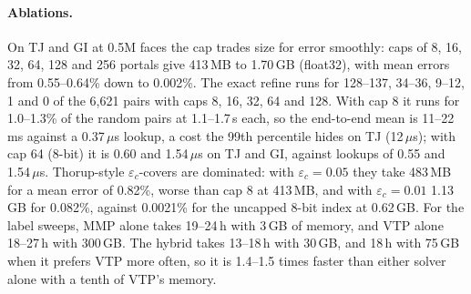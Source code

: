 \documentclass[sigconf,nonacm,screen]{acmart}
\newcommand{\eps}{\varepsilon}
\begin{document}
\paragraph{Ablations.}
On TJ and GI at 0.5M faces the cap trades size for error smoothly: caps of 8, 16, 32, 64, 128 and 256 portals give
413\,MB to 1.70\,GB (float32), with mean errors from 0.55--0.64\% down to 0.002\%. The exact refine runs for
128--137, 34--36, 9--12, 1 and 0 of the 6,621 pairs with caps 8, 16, 32, 64 and 128. With cap 8 it runs for
1.0--1.3\% of the random pairs at 1.1--1.7\,s each, so the end-to-end mean is 11--22\,ms against a 0.37\,$\mu$s
lookup, a cost the 99th percentile hides on TJ (12\,$\mu$s); with cap 64 (8-bit) it is 0.60 and 1.54\,$\mu$s on
TJ and GI, against lookups of 0.55 and 1.54\,$\mu$s. Thorup-style $\eps_c$-covers are dominated:
with $\eps_c=0.05$ they take 483\,MB for a mean error of 0.82\%, worse than cap 8 at 413\,MB, and with
$\eps_c=0.01$ 1.13\,GB for 0.082\%, against 0.0021\% for the uncapped 8-bit index at 0.62\,GB. For the label
sweeps, MMP alone takes 19--24\,h with 3\,GB of memory, and VTP alone 18--27\,h with 300\,GB. The hybrid takes 13--18\,h with
30\,GB, and 18\,h with 75\,GB when it prefers VTP more often, so it is 1.4--1.5 times faster than either solver alone
with a tenth of VTP's memory.
\end{document}
